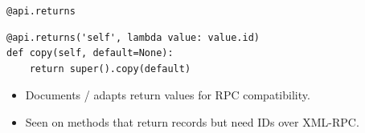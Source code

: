 \begin{frame}[fragile]{\texttt{@api.returns}}
\begin{lstlisting}
@api.returns('self', lambda value: value.id)
def copy(self, default=None):
	return super().copy(default)
\end{lstlisting}
	\begin{itemize}
		\item Documents / adapts return values for RPC compatibility.
		\item Seen on methods that return records but need IDs over XML-RPC.
	\end{itemize}
\end{frame}
